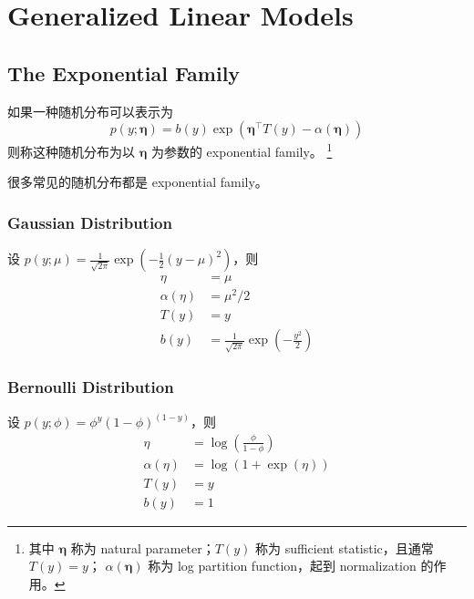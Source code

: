 \chapter{Generalized Linear Models}
	\section{The Exponential Family}
		如果一种随机分布可以表示为
		\begin{equation}
			p(y; \bm{\eta}) = b(y) \exp \left( \bm{\eta}^\intercal T(y) - \alpha(\bm{\eta}) \right)
		\end{equation}
		则称这种随机分布为以 $ \bm{\eta} $ 为参数的 exponential family。
		\footnote{其中 $ \bm{\eta} $ 称为 natural parameter；$ T(y) $ 称为 sufficient statistic，且通常 $ T(y) = y $；
			$ \alpha(\bm{\eta}) $ 称为 log partition function，起到 normalization 的作用。}
		
		很多常见的随机分布都是 exponential family。
		
		\subsection{Gaussian Distribution} \label{subsec:glm-gau}
			设 $ p(y; \mu) = \frac{1}{\sqrt{2\pi}} \exp \left( - \frac{1}{2} (y-\mu)^2 \right) $，则
			\begin{align*}
				\eta &= \mu \\
				\alpha(\eta) &= \mu^2 / 2 \\
				T(y) &= y \\
				b(y) &= \frac{1}{\sqrt{2\pi}} \exp(-\frac{y^2}{2})
			\end{align*}
			
		\subsection{Bernoulli Distribution} \label{subsec:glm-ber}
			设 $ p(y; \phi) = \phi^y (1-\phi)^{(1-y)} $，则
			\begin{align*}
				\eta &= \log ( \frac{\phi}{1-\phi} ) \\
				\alpha(\eta) &= \log ( 1+\exp(\eta) ) \\
				T(y) &= y \\
				b(y)& = 1
			\end{align*}
			
